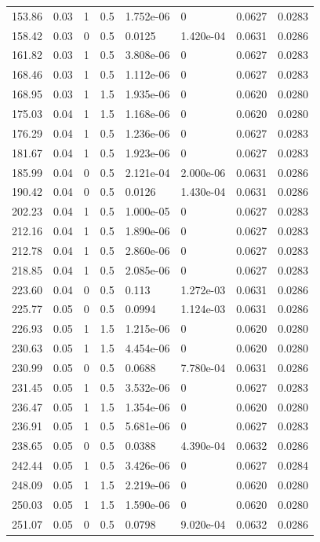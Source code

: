 \documentclass[preview]{standalone}
\begin{document}
{{\begin{tabular}{L{1.2cm}C{1.2cm} C{0.3cm}C{0.5cm} C{1.4cm}C{1.4cm} C{1.4cm}C{1.4cm}}
  153.86  &  0.03  & 1     & 0.5 &  1.752e-06  & 0  & 0.0627 &  0.0283   \\ 
  158.42  &  0.03  & 0     & 0.5 &  0.0125  & 1.420e-04  & 0.0631 &  0.0286   \\ 
  161.82  &  0.03  & 1     & 0.5 &  3.808e-06  & 0  & 0.0627 &  0.0283   \\ 
  168.46  &  0.03  & 1     & 0.5 &  1.112e-06  & 0  & 0.0627 &  0.0283   \\ 
  168.95  &  0.03  & 1     & 1.5 &  1.935e-06  & 0  & 0.0620 &  0.0280   \\ 
  175.03  &  0.04  & 1     & 1.5 &  1.168e-06  & 0  & 0.0620 &  0.0280   \\ 
  176.29  &  0.04  & 1     & 0.5 &  1.236e-06  & 0  & 0.0627 &  0.0283   \\ 
  181.67  &  0.04  & 1     & 0.5 &  1.923e-06  & 0  & 0.0627 &  0.0283   \\ 
  185.99  &  0.04  & 0     & 0.5 &  2.121e-04  & 2.000e-06  & 0.0631 &  0.0286   \\ 
  190.42  &  0.04  & 0     & 0.5 &  0.0126  & 1.430e-04  & 0.0631 &  0.0286   \\ 
  202.23  &  0.04  & 1     & 0.5 &  1.000e-05  & 0  & 0.0627 &  0.0283   \\ 
  212.16  &  0.04  & 1     & 0.5 &  1.890e-06  & 0  & 0.0627 &  0.0283   \\ 
  212.78  &  0.04  & 1     & 0.5 &  2.860e-06  & 0  & 0.0627 &  0.0283   \\ 
  218.85  &  0.04  & 1     & 0.5 &  2.085e-06  & 0  & 0.0627 &  0.0283   \\ 
  223.60  &  0.04  & 0     & 0.5 &  0.113  & 1.272e-03  & 0.0631 &  0.0286   \\ 
  225.77  &  0.05  & 0     & 0.5 &  0.0994  & 1.124e-03  & 0.0631 &  0.0286   \\ 
  226.93  &  0.05  & 1     & 1.5 &  1.215e-06  & 0  & 0.0620 &  0.0280   \\ 
  230.63  &  0.05  & 1     & 1.5 &  4.454e-06  & 0  & 0.0620 &  0.0280   \\ 
  230.99  &  0.05  & 0     & 0.5 &  0.0688  & 7.780e-04  & 0.0631 &  0.0286   \\ 
  231.45  &  0.05  & 1     & 0.5 &  3.532e-06  & 0  & 0.0627 &  0.0283   \\ 
  236.47  &  0.05  & 1     & 1.5 &  1.354e-06  & 0  & 0.0620 &  0.0280   \\ 
  236.91  &  0.05  & 1     & 0.5 &  5.681e-06  & 0  & 0.0627 &  0.0283   \\ 
  238.65  &  0.05  & 0     & 0.5 &  0.0388  & 4.390e-04  & 0.0632 &  0.0286   \\ 
  242.44  &  0.05  & 1     & 0.5 &  3.426e-06  & 0  & 0.0627 &  0.0284   \\ 
  248.09  &  0.05  & 1     & 1.5 &  2.219e-06  & 0  & 0.0620 &  0.0280   \\ 
  250.03  &  0.05  & 1     & 1.5 &  1.590e-06  & 0  & 0.0620 &  0.0280   \\ 
  251.07  &  0.05  & 0     & 0.5 &  0.0798  & 9.020e-04  & 0.0632 &  0.0286   \\ 
\hline 
\end{tabular} 

}}
\end{document}
